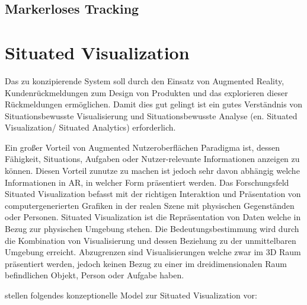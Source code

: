
\subsection{Markerloses Tracking}



\section{Situated Visualization}

Das zu konzipierende System soll durch den Einsatz von Augmented Reality, Kundenrückmeldungen zum Design von Produkten und das explorieren dieser Rückmeldungen ermöglichen. Damit dies gut gelingt 
ist ein gutes Verständnis von Situationsbewusste Visualisierung und Situationsbewusste Analyse (en. Situated Visualization/ Situated Analytics) erforderlich. 

\cite[p.~239]{DieterSchmalstieg2016} Ein großer Vorteil von Augmented Nutzeroberflächen Paradigma ist, dessen Fähigkeit, Situations, Aufgaben oder Nutzer-relevante Informationen anzeigen zu können. 
Diesen Vorteil zunutze zu machen ist jedoch sehr davon abhängig welche Informationen in AR, in welcher Form  präsentiert werden. Das Forschungsfeld Situated Visualization befasst mit der richtigen Interaktion und Präsentation
von computergenerierten Grafiken in der realen Szene mit physischen Gegenständen oder Personen. \cite[p.~188]{ElSayedNevenA.M.BruceH.ThomasRossT.Smith2015} Situated Visualization ist die Repräsentation von 
Daten welche in Bezug zur physischen Umgebung stehen. Die Bedeutungsbestimmung wird durch die Kombination von Visualisierung und dessen Beziehung zu der unmittelbaren Umgebung erreicht. \cite[p.~240]{DieterSchmalstieg2016} Abzugrenzen sind Visualisierungen welche zwar im 3D Raum präsentiert werden, jedoch keinen Bezug zu einer im dreidimensionalen Raum befindlichen Objekt, Person oder Aufgabe haben.

\cite[p.~192]{ElSayedNevenA.M.BruceH.ThomasRossT.Smith2015} \cite[p.~2]{WesleyWillettYvonneJansen} stellen folgendes konzeptionelle Model zur Situated Visualization vor:

